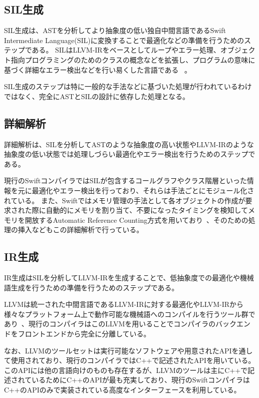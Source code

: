 \subsection{SIL生成}

SIL生成は、ASTを分析してより抽象度の低い独自中間言語であるSwift Intermediate Language(SIL)に変換することで最適化などの準備を行うためのステップである。
SILはLLVM-IRをベースとしてループやエラー処理、オブジェクト指向プログラミングのためのクラスの概念などを拡張し、プログラムの意味に基づく詳細なエラー検出などを行い易くした言語である ~\cite{sil}。

SIL生成のステップは特に一般的な手法などに基づいた処理が行われているわけではなく、完全にASTとSILの設計に依存した処理となる。

\subsection{詳細解析}
\label{refinement:structure:analyze}

詳細解析は、SILを分析してASTのような抽象度の高い状態やLLVM-IRのような抽象度の低い状態では処理しづらい最適化やエラー検出を行うためのステップである。

現行のSwiftコンパイラではSILが包含するコールグラフやクラス階層といった情報を元に最適化やエラー検出を行っており、それらは手法ごとにモジュール化されている。
また、Swiftではメモリ管理の手法として各オブジェクトの作成が要求された際に自動的にメモリを割り当て、不要になったタイミングを検知してメモリを開放するAutomatic Reference Counting方式を用いており~\cite{arc}、そのための処理の挿入などもこの詳細解析で行っている。

\subsection{IR生成}

IR生成はSILを分析してLLVM-IRを生成することで、低抽象度での最適化や機械語生成を行うための準備を行うためのステップである。

LLVMは統一された中間言語であるLLVM-IRに対する最適化やLLVM-IRから様々なプラットフォーム上で動作可能な機械語へのコンパイルを行うツール群であり~\cite{llvm}、現行のコンパイラはこのLLVMを用いることでコンパイラのバックエンドをフロントエンドから完全に分離している。

なお、LLVMのツールセットは実行可能なソフトウェアや用意されたAPIを通して使用されており、現行のコンパイラではC++で記述されたAPIを用いている。
このAPIには他の言語向けのものも存在するが、LLVMのツールは主にC++で記述されているためにC++のAPIが最も充実しており、現行のSwiftコンパイラはC++のAPIのみで実装されている高度なインターフェースを利用している。

